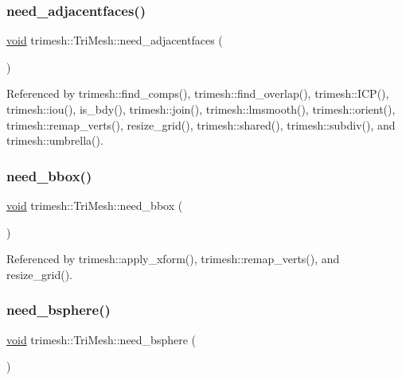 \subsubsection{\texorpdfstring{need\+\_\+adjacentfaces()}{need\_adjacentfaces()}}
{\footnotesize\ttfamily \hyperlink{namespacetrimesh_a784ddfd979e1c579bda795a8edfc3f43}{void} trimesh\+::\+Tri\+Mesh\+::need\+\_\+adjacentfaces (\begin{DoxyParamCaption}{ }\end{DoxyParamCaption})}



Referenced by trimesh\+::find\+\_\+comps(), trimesh\+::find\+\_\+overlap(), trimesh\+::\+I\+C\+P(), trimesh\+::iou(), is\+\_\+bdy(), trimesh\+::join(), trimesh\+::lmsmooth(), trimesh\+::orient(), trimesh\+::remap\+\_\+verts(), resize\+\_\+grid(), trimesh\+::shared(), trimesh\+::subdiv(), and trimesh\+::umbrella().

\mbox{\label{classtrimesh_1_1TriMesh_a5cbc69a7bab72cfeba6f4812187e4dae}} 
\subsubsection{\texorpdfstring{need\+\_\+bbox()}{need\_bbox()}}
{\footnotesize\ttfamily \hyperlink{namespacetrimesh_a784ddfd979e1c579bda795a8edfc3f43}{void} trimesh\+::\+Tri\+Mesh\+::need\+\_\+bbox (\begin{DoxyParamCaption}{ }\end{DoxyParamCaption})}



Referenced by trimesh\+::apply\+\_\+xform(), trimesh\+::remap\+\_\+verts(), and resize\+\_\+grid().

\mbox{\label{classtrimesh_1_1TriMesh_a8fa9018f79e0db0dea0c55b31536590c}} 
\subsubsection{\texorpdfstring{need\+\_\+bsphere()}{need\_bsphere()}}
{\footnotesize\ttfamily \hyperlink{namespacetrimesh_a784ddfd979e1c579bda795a8edfc3f43}{void} trimesh\+::\+Tri\+Mesh\+::need\+\_\+bsphere (\begin{DoxyParamCaption}{ }\end{DoxyParamCaption})}



